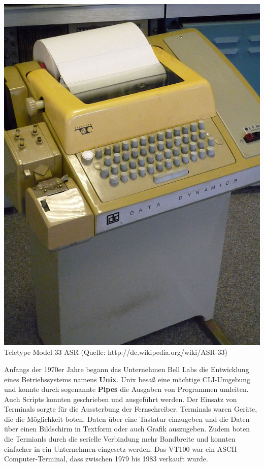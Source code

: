 \documentclass[12pt,a4paper]{report}
\begin{document}
\begin{center}
\includegraphics[scale=0.52]{img/teletype.jpg}\\
Teletype Model 33 ASR (Quelle: http://de.wikipedia.org/wiki/ASR-33)
\end{center}

Anfangs der 1970er Jahre begann das Unternehmen Bell Labs die Entwicklung eines Betriebssystems namens \textbf{Unix}. Unix besaß eine mächtige CLI-Umgebung und konnte durch sogenannte \textbf{Pipes} die Ausgaben von Programmen umleiten. Auch Scripts konnten geschrieben und ausgeführt werden. Der Einsatz von Terminals sorgte für die Aussterbung der Fernschreiber. Terminals waren Geräte, die die Möglichkeit boten, Daten über eine Tastatur einzugeben und die Daten über einen Bildschirm in Textform oder auch Grafik auszugeben. Zudem boten die Termianls durch die serielle Verbindung mehr Bandbreite und konnten einfacher in ein Unternehmen eingesetz werden. Das VT100 war ein ASCII-Computer-Terminal, dass zwischen 1979 bis 1983 verkauft wurde.\\
\end{document}
